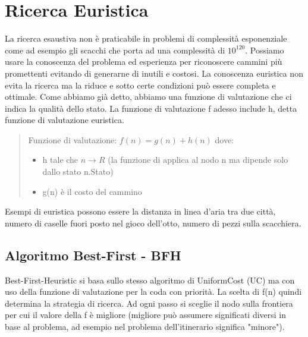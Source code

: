 \documentclass{article}
\begin{document}
\section{Ricerca Euristica}
La ricerca esaustiva non è praticabile in problemi di complessità esponenziale come ad esempio gli scacchi che porta ad una complessità di $10^120$. Possiamo usare la conoscenza del problema ed esperienza per riconoscere cammini più promettenti evitando di generarne di inutili e costosi. La conoscenza euristica non evita la ricerca ma la riduce e sotto certe condizioni può essere completa e ottimale. \newline 
Come abbiamo già detto, abbiamo una funzione di valutazione che ci indica la qualità dello stato. La funzione di valutazione f adesso include h, detta funzione di valutazione euristica.
\begin{quote}
    Funzione di valutazione: $f(n) = g(n) + h(n)$ dove: 
    \begin{itemize}
        \item h tale che $n \rightarrow R$ (la funzione di applica al nodo n ma dipende solo dallo stato n.Stato)
        \item g(n) è il costo del cammino
    \end{itemize}
\end{quote}
Esempi di euristica possono essere la distanza in linea d'aria tra due città, numero di caselle fuori posto nel gioco dell'otto, numero di pezzi sulla scacchiera.

\subsection{Algoritmo Best-First - BFH}
Best-First-Heuristic si basa sullo stesso algoritmo di UniformCost (UC) ma con uso della funzione di valutazione per la coda con priorità. La scelta di f(n) quindi determina la strategia di ricerca. Ad ogni passo si sceglie il nodo sulla frontiera per cui il valore della f è migliore (migliore può assumere significati diversi in base al problema, ad esempio nel problema dell'itinerario significa "minore").

\clearpage
\end{document}
